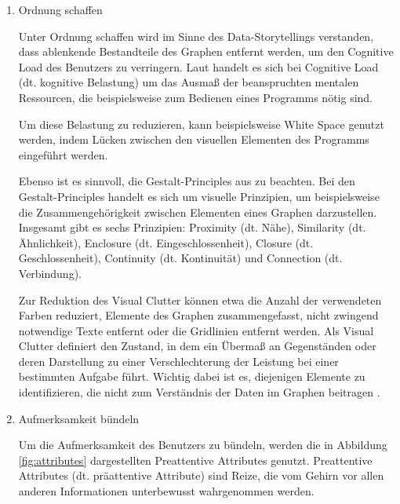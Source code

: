 \begin{enumerate}
    \item Ordnung schaffen\hfill
    
    Unter \glqq Ordnung schaffen\grqq{} wird im Sinne des Data-Storytellings verstanden, dass ablenkende Bestandteile des Graphen entfernt werden, um den \glqq Cognitive Load\grqq{} des Benutzers zu verringern. Laut \cite{Plass.2010} handelt es sich bei Cognitive Load (dt. kognitive Belastung) um das Ausmaß der beanspruchten mentalen Ressourcen, die beispielsweise zum Bedienen eines Programms nötig sind.

    Um diese Belastung zu reduzieren, kann beispielsweise White Space genutzt werden, indem Lücken zwischen den visuellen Elementen des Programms eingeführt werden. %

    Ebenso ist es sinnvoll, die Gestalt-Principles aus \cite{Schwabish.2021} zu beachten. Bei den Gestalt-Principles handelt es sich um visuelle Prinzipien, um beispielsweise die  Zusammengehörigkeit zwischen Elementen eines Graphen darzustellen. Insgesamt gibt es sechs Prinzipien: Proximity (dt. Nähe), Similarity (dt. Ähnlichkeit), Enclosure (dt. Eingeschlossenheit), Closure (dt. Geschlossenheit), Continuity (dt. Kontinuität) und Connection (dt. Verbindung).

    Zur Reduktion des Visual Clutter können etwa die Anzahl der verwendeten Farben reduziert, Elemente des Graphen zusammengefasst, nicht zwingend notwendige Texte entfernt oder die Gridlinien entfernt werden. Als Visual Clutter definiert \cite{Rosenholtz.2005} den Zustand, in dem ein Übermaß an Gegenständen oder deren Darstellung zu einer Verschlechterung der Leistung bei einer bestimmten Aufgabe führt. Wichtig dabei ist es, diejenigen Elemente zu identifizieren, die nicht zum Verständnis der Daten im Graphen beitragen \cite{TalksatGoogle.2015}.

    \item Aufmerksamkeit bündeln\hfill

    Um die Aufmerksamkeit des Benutzers zu bündeln, werden die in Abbildung \ref{fig:attributes} dargestellten \glqq Preattentive Attributes\grqq{} genutzt. Preattentive Attributes (dt. präattentive Attribute) sind Reize, die vom Gehirn vor allen anderen Informationen unterbewusst wahrgenommen werden.


\end{enumerate}
